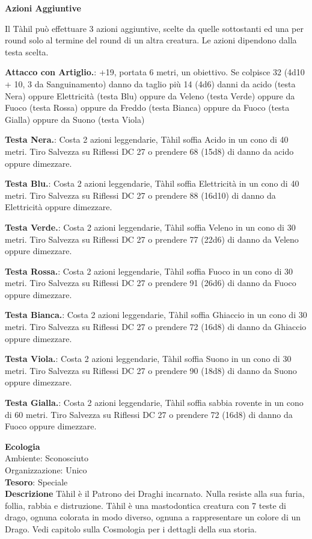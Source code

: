 \begin{multicols}{2}
	\textbf{Azioni Aggiuntive}

	Il Tàhil può effettuare 3 azioni aggiuntive, scelte da quelle sottostanti ed una per round solo al termine del round di un altra creatura. Le azioni dipendono dalla testa scelta.

	\textbf{Attacco con Artiglio.}: +19, portata 6 metri, un obiettivo. Se colpisce 32 (4d10 + 10, 3 da Sanguinamento) danno da taglio più 14 (4d6) danni da acido (testa Nera) oppure Elettricità (testa Blu) oppure da Veleno (testa Verde) oppure da Fuoco (testa Rossa) oppure da Freddo (testa Bianca) oppure da Fuoco (testa Gialla) oppure da Suono (testa Viola)

	\textbf{Testa Nera.}: Costa 2 azioni leggendarie, Tàhil soffia Acido in un cono di 40 metri. Tiro Salvezza su Riflessi DC 27 o prendere 68 (15d8) di danno da acido oppure dimezzare.

	\textbf{Testa Blu.}: Costa 2 azioni leggendarie, Tàhil soffia Elettricità in un cono di 40 metri. Tiro Salvezza su Riflessi DC 27 o prendere 88 (16d10) di danno da Elettricità oppure dimezzare.

	\textbf{Testa Verde.}: Costa 2 azioni leggendarie, Tàhil soffia Veleno in un cono di 30 metri. Tiro Salvezza su Riflessi DC 27 o prendere 77 (22d6) di danno da Veleno oppure dimezzare.

	\textbf{Testa Rossa.}: Costa 2 azioni leggendarie, Tàhil soffia Fuoco in un cono di 30 metri. Tiro Salvezza su Riflessi DC 27 o prendere 91 (26d6) di danno da Fuoco oppure dimezzare.

	\textbf{Testa Bianca.}: Costa 2 azioni leggendarie, Tàhil soffia Ghiaccio in un cono di 30 metri. Tiro Salvezza su Riflessi DC 27 o prendere 72 (16d8) di danno da Ghiaccio oppure dimezzare.

	\textbf{Testa Viola.}: Costa 2 azioni leggendarie, Tàhil soffia Suono in un cono di 30 metri. Tiro Salvezza su Riflessi DC 27 o prendere 90 (18d8) di danno da Suono oppure dimezzare.

	\textbf{Testa Gialla.}: Costa 2 azioni leggendarie, Tàhil soffia sabbia rovente in un cono di 60 metri. Tiro Salvezza su Riflessi DC 27 o prendere 72 (16d8) di danno da Fuoco oppure dimezzare.


	\textbf{Ecologia}\\
	Ambiente: Sconosciuto\\
	Organizzazione: Unico\\
	\textbf{Tesoro}: Speciale\\

	\textbf{Descrizione}
	Tàhil è il Patrono dei Draghi incarnato. Nulla resiste alla sua furia, follia, rabbia e distruzione. Tàhil è una mastodontica creatura con 7 teste di drago, ognuna colorata in modo diverso, ognuna a rappresentare un colore di un Drago. Vedi capitolo sulla Cosmologia per i dettagli della sua storia.



\end{multicols}
